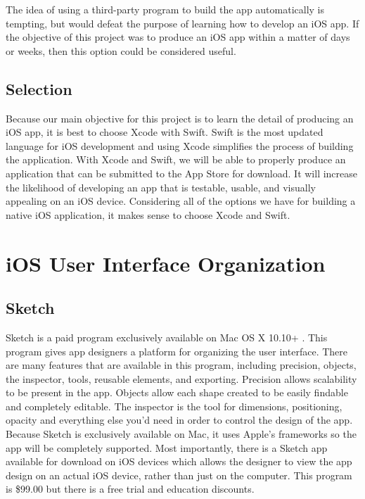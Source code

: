\documentclass[letterpaper,10pt,draftclsnofoot,onecolumn,titlepage]{IEEEtran}
\begin{document}
	The idea of using a third-party program to build the app automatically is tempting, but would defeat the purpose of learning how to develop an iOS app.
	If the objective of this project was to produce an iOS app within a matter of days or weeks, then this option could be considered useful.

	\subsection{Selection}
	Because our main objective for this project is to learn the detail of producing an iOS app, it is best to choose Xcode with Swift.
	Swift is the most updated language for iOS development and using Xcode simplifies the process of building the application.
	With Xcode and Swift, we will be able to properly produce an application that can be submitted to the App Store for download.
	It will increase the likelihood of developing an app that is testable, usable, and visually appealing on an iOS device.
	Considering all of the options we have for building a native iOS application, it makes sense to choose Xcode and Swift.

	\section{iOS User Interface Organization}
	\subsection{Sketch}
	Sketch is a paid program exclusively available on Mac OS X 10.10+ \cite{Sketch}.
	This program gives app designers a platform for organizing the user interface.
	There are many features that are available in this program, including precision, objects, the inspector, tools, reusable elements, and exporting.
	Precision allows scalability to be present in the app.
	Objects allow each shape created to be easily findable and completely editable.
	The inspector is the tool for dimensions, positioning, opacity and everything else you'd need in order to control the design of the app.
	Because Sketch is exclusively available on Mac, it uses Apple's frameworks so the app will be completely supported.
	Most importantly, there is a Sketch app available for download on iOS devices which allows the designer to view the app design on an actual iOS device, rather than just on the computer.
	This program is \$99.00 but there is a free trial and education discounts.
\end{document}
